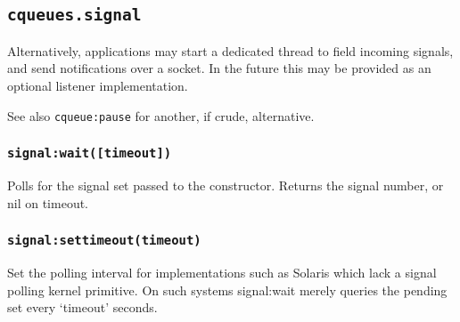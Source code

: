 \documentclass[11pt, oneside]{memoir}
\newcommand*{\routine}[1]{\texttt{#1}\xspace}
\newcommand*{\fn}[1]{\texttt{#1}\xspace}
\newcounter{toccols}
\newenvironment{Module}[1]{
	\subsection{\texttt{#1}}
	\addtocontents{toc}{
		\protect\begin{multicols}{\value{toccols}}
	}
}{
	\addtocontents{toc}{\protect\end{multicols}}
}
\begin{document}
\begin{Module}{cqueues.signal}
Alternatively, applications may start a dedicated thread to field incoming signals, and send notifications over a socket. In the future this may be provided as an optional listener implementation.

See also \routine{cqueue:pause} for another, if crude, alternative.

\subsubsection[\fn{signal:wait}]{\fn{signal:wait([timeout])}}
Polls for the signal set passed to the constructor. Returns the signal number, or nil on timeout.

\subsubsection[\fn{signal:settimeout}]{\fn{signal:settimeout(timeout)}}
Set the polling interval for implementations such as Solaris which lack a signal polling kernel primitive. On such systems signal:wait merely queries the pending set every `timeout' seconds.

\end{Module}
\end{document}
